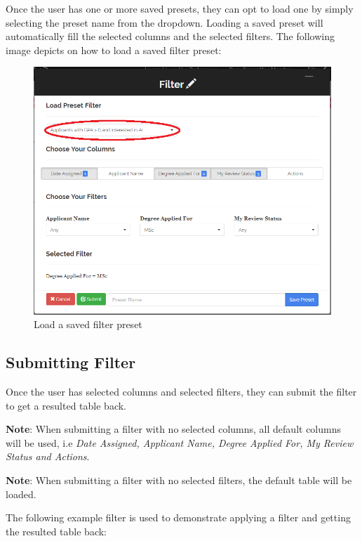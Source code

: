 \documentclass[fontsize=12pt,paper=letter,twoside]{scrartcl}
\begin{document}
\newpage
\bigskip
\noindent Once the user has one or more saved presets, they can opt to load one by simply selecting the preset name from the dropdown. Loading a saved preset will automatically fill the selected columns and the selected filters. The following image depicts on how to load a saved filter preset:

\bigskip
\begin{figure}[!htb]
\begin{center}
\includegraphics[width=.9\textwidth]{images/load_preset.png}
\end{center}
\caption{Load a saved filter preset}
\label{fig:load_preset}
\end{figure}

\clearpage
\newpage
\subsection{Submitting Filter}

Once the user has selected columns and selected filters, they can submit the filter to get a resulted table back.

\bigskip
\noindent \textbf{Note}: When submitting a filter with no selected columns, all default columns will be used, i.e \emph{Date Assigned, Applicant Name, Degree Applied For, My Review Status and Actions}.

\bigskip
\noindent \textbf{Note}: When submitting a filter with no selected filters, the default table will be loaded.

\bigskip
\noindent The following example filter is used to demonstrate applying a filter and getting the resulted table back:
\end{document}
